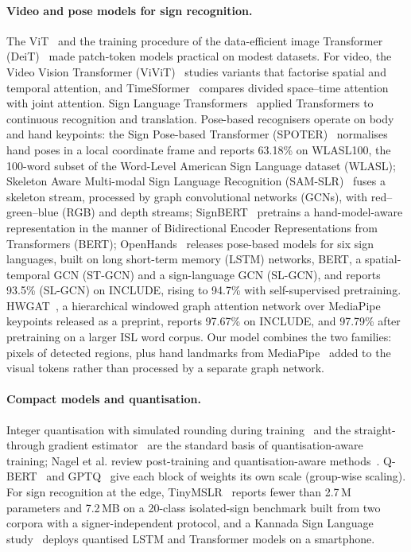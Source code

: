 \documentclass[pdflatex,sn-mathphys-num,twocolumn,lineno]{sn-jnl}
\theoremstyle{thmstyleone}%
\begin{document}
\paragraph{Video and pose models for sign recognition.} The ViT~\cite{dosovitskiy2021vit} and the training procedure of the data-efficient image Transformer (DeiT)~\cite{touvron2021deit} made patch-token models practical on modest datasets. For video, the Video Vision Transformer (ViViT)~\cite{arnab2021vivit} studies variants that factorise spatial and temporal attention, and TimeSformer~\cite{bertasius2021timesformer} compares divided space--time attention with joint attention. Sign Language Transformers~\cite{camgoz2020slt} applied Transformers to continuous recognition and translation. Pose-based recognisers operate on body and hand keypoints: the Sign Pose-based Transformer (SPOTER)~\cite{bohacek2022spoter} normalises hand poses in a local coordinate frame and reports 63.18\% on WLASL100, the 100-word subset of the Word-Level American Sign Language dataset (WLASL); Skeleton Aware Multi-modal Sign Language Recognition (SAM-SLR)~\cite{jiang2021samslr} fuses a skeleton stream, processed by graph convolutional networks (GCNs), with red--green--blue (RGB) and depth streams; SignBERT~\cite{hu2021signbert} pretrains a hand-model-aware representation in the manner of Bidirectional Encoder Representations from Transformers (BERT); OpenHands~\cite{selvaraj2022openhands} releases pose-based models for six sign languages, built on long short-term memory (LSTM) networks, BERT, a spatial-temporal GCN (ST-GCN) and a sign-language GCN (SL-GCN), and reports 93.5\% (SL-GCN) on INCLUDE, rising to 94.7\% with self-supervised pretraining. HWGAT~\cite{patra2024hwgat}, a hierarchical windowed graph attention network over MediaPipe keypoints released as a preprint, reports 97.67\% on INCLUDE, and 97.79\% after pretraining on a larger ISL word corpus. Our model combines the two families: pixels of detected regions, plus hand landmarks from MediaPipe~\cite{lugaresi2019mediapipe,zhang2020mphands} added to the visual tokens rather than processed by a separate graph network.

\paragraph{Compact models and quantisation.} Integer quantisation with simulated rounding during training~\cite{jacob2018quant} and the straight-through gradient estimator~\cite{bengio2013ste} are the standard basis of quantisation-aware training; Nagel et al. review post-training and quantisation-aware methods~\cite{nagel2021whitepaper}. Q-BERT~\cite{shen2020qbert} and GPTQ~\cite{frantar2023gptq} give each block of weights its own scale (group-wise scaling). For sign recognition at the edge, TinyMSLR~\cite{lamaakal2026tinymslr} reports fewer than 2.7\,M parameters and 7.2\,MB on a 20-class isolated-sign benchmark built from two corpora with a signer-independent protocol, and a Kannada Sign Language study~\cite{venkatappa2026kannada} deploys quantised LSTM and Transformer models on a smartphone.
\end{document}
